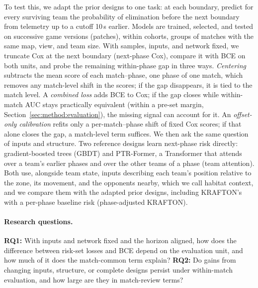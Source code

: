 \documentclass[sigconf,anonymous]{acmart}
\begin{document}
To test this, we adapt the prior designs to one task: at each boundary, predict for every surviving team the probability of elimination before the next boundary from telemetry up to a cutoff 10\,s earlier. Models are trained, selected, and tested on successive game versions (patches), within cohorts, groups of matches with the same map, view, and team size. With samples, inputs, and network fixed, we truncate Cox at the next boundary (next-phase Cox), compare it with BCE on both units, and probe the remaining within-phase gap in three ways. \emph{Centering} subtracts the mean score of each match--phase, one phase of one match, which removes any match-level shift in the scores; if the gap disappears, it is tied to the match level. A \emph{combined loss} adds BCE to Cox; if the gap closes while within-match AUC stays practically equivalent (within a pre-set margin, Section~\ref{sec:method:evaluation}), the missing signal can account for it. An \emph{offset-only calibration} refits only a per-match--phase shift of fixed Cox scores; if that alone closes the gap, a match-level term suffices. We then ask the same question of inputs and structure. Two reference designs learn next-phase risk directly: gradient-boosted trees (GBDT) and PTR-Former, a Transformer that attends over a team's earlier phases and over the other teams of a phase (team attention). Both use, alongside team state, inputs describing each team's position relative to the zone, its movement, and the opponents nearby, which we call habitat context, and we compare them with the adapted prior designs, including KRAFTON's with a per-phase baseline risk (phase-adjusted KRAFTON).

\paragraph{Research questions.}
\textbf{RQ1:} With inputs and network fixed and the horizon aligned, how does the difference between risk-set losses and BCE depend on the evaluation unit, and how much of it does the match-common term explain?
\textbf{RQ2:} Do gains from changing inputs, structure, or complete designs persist under within-match evaluation, and how large are they in match-review terms?
\end{document}
